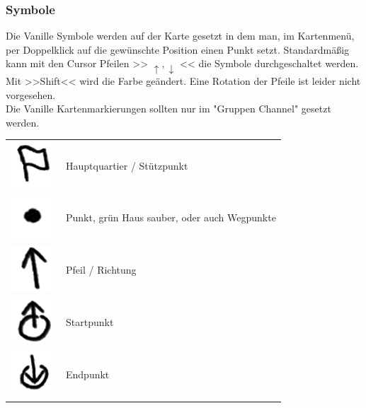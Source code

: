 \newpage

\subsubsection{Symbole}
	Die Vanille Symbole werden auf der Karte gesetzt in dem man, im Kartenmenü, per Doppelklick auf die gewünschte Position einen Punkt setzt. Standardmäßig kann mit den Cursor Pfeilen >> \begin{math} \uparrow,\downarrow \end{math} << die Symbole durchgeschaltet werden. Mit >>Shift<< wird die Farbe geändert. Eine Rotation der Pfeile ist leider nicht vorgesehen. \\
	Die Vanille Kartenmarkierungen sollten nur im "Gruppen Channel" gesetzt werden.

\begin{longtable}{p{3cm} p{15cm}}
	\includegraphics[scale=1]{./img/fortgeschrittenes/karteUndMarkierungen/HQ.png}			& 		Hauptquartier / Stützpunkt \\
	\includegraphics[scale=1]{./img/fortgeschrittenes/karteUndMarkierungen/Punkt.png}			&		Punkt, grün Haus sauber, oder auch Wegpunkte \\
	\includegraphics[scale=1]{./img/fortgeschrittenes/karteUndMarkierungen/Pfeil.png}			&		Pfeil / Richtung \\
	\includegraphics[scale=1]{./img/fortgeschrittenes/karteUndMarkierungen/Start.png}			&		Startpunkt \\
	\includegraphics[scale=1]{./img/fortgeschrittenes/karteUndMarkierungen/Endpunkt.png}		&		Endpunkt \\

\end{longtable}
